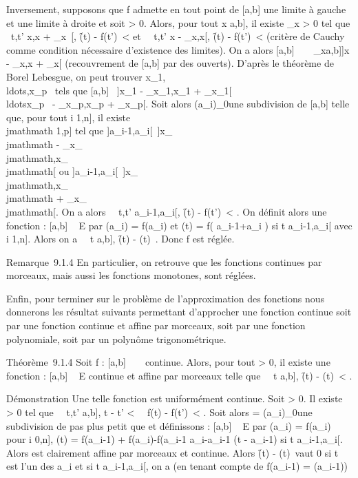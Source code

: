 \documentclass[]{article}
\begin{document}
Inversement, supposons que f admette en tout point de {[}a,b{]} une
limite à gauche et une limite à droite et soit \epsilon \textgreater{} 0.
Alors, pour tout x \in {[}a,b{]}, il existe \eta_x \textgreater{} 0
tel que \forall~t,t' \in{]}x,x + \eta_x~{[},
\f(t) - f(t')\
\textless{} \epsilon et \forall~~t,t' \in{]}x -
\eta_x,x{[}, \f(t) -
f(t')\ \textless{} \epsilon (critère de Cauchy comme
condition nécessaire d'existence des limites). On a alors {[}a,b{]}
\subset~\⋃ ~
_x\in{[}a,b{]}{]}x - \eta_x,x + \eta_x{[} (recouvrement
de {[}a,b{]} par des ouverts). D'après le théorème de Borel Lebesgue, on
peut trouver
x_1,\\ldots,x_p~
tels que {[}a,b{]} \subset~{]}x_1 -
\eta_x_1,x_1 +
\eta_x_1{[}\cup\\ldots\cup{]}x_p~
- \eta_x_p,x_p + \eta_x_p{[}.
Soit alors (a_i)_0\leqi\leqn une subdivision de {[}a,b{]}
telle que, pour tout i \in {[}1,n{]}, il existe \\jmathmath \in {[}1,p{]} tel que
{]}a_i-1,a_i{[}\subset~{]}x_\\jmathmath -
\eta_x_\\jmathmath,x_\\jmathmath{[} ou
{]}a_i-1,a_i{[}\subset~{]}x_\\jmathmath,x_\\jmathmath +
\eta_x_\\jmathmath{[}. On a alors \forall~~t,t'
\in{]}a_i-1,a_i{[}, \f(t) -
f(t')\ \textless{} \epsilon. On définit alors une
fonction \phi : {[}a,b{]} \rightarrow~ E par \phi(a_i) = f(a_i) et \phi(t)
= f( a_i-1+a_i \over 2 ) si t
\in{]}a_i-1,a_i{[} avec i \in {[}1,n{]}. Alors on a
\forall~~t \in {[}a,b{]}, \f(t)
- \phi(t)\ \leq \epsilon. Donc f est réglée.

Remarque~9.1.4 En particulier, on retrouve que les fonctions continues
par morceaux, mais aussi les fonctions monotones, sont réglées.

Enfin, pour terminer sur le problème de l'approximation des fonctions
nous donnerons les résultat suivants permettant d'approcher une fonction
continue soit par une fonction continue et affine par morceaux, soit par
une fonction polynomiale, soit par un polynôme trigonométrique.

Théorème~9.1.4 Soit f : {[}a,b{]} \rightarrow~ ~ continue. Alors, pour tout \epsilon
\textgreater{} 0, il existe une fonction \phi : {[}a,b{]} \rightarrow~ E continue et
affine par morceaux telle que \forall~~t \in {[}a,b{]},
\f(t) - \phi(t)\
\textless{} \epsilon.

Démonstration Une telle fonction est uniformément continue. Soit \epsilon
\textgreater{} 0. Il existe \eta \textgreater{} 0 tel que
\forall~~t,t' \in {[}a,b{]}, t - t'
\textless{} \eta \rigtharrow~\ f(t) -
f(t')\ \textless{} \epsilon \over 2
. Soit alors \sigma = (a_i)_0\leqi\leqn une subdivision de pas
plus petit que \eta et définissons \phi : {[}a,b{]} \rightarrow~ E par \phi(a_i) =
f(a_i) pour i \in {[}0,n{]}, \phi(t) = f(a_i-1) +
f(a_i)-f(a_i-1 \over
a_i-a_i-1 (t - a_i-1) si t
\in{]}a_i-1,a_i{[}. Alors \phi est clairement affine par
morceaux et continue. Alors \f(t) -
\phi(t)\ vaut 0 si t est l'un des a_i et
si t \in{]}a_i-1,a_i{[}, on a (en tenant compte de
f(a_i-1) = \phi(a_i-1))
\end{document}
